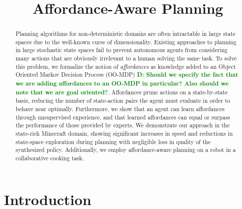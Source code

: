\documentclass[conference]{IEEEtran}
\newcommand{\dnote}[1]{\textcolor{Green}{\textbf{D: #1}}}
\begin{document}
\title{Affordance-Aware Planning}

\author{
}

\maketitle

\begin{abstract}
Planning algorithms for non-deterministic domains are often
intractable in large state spaces due to the well-known curse of
dimensionality. Existing approaches to planning in large stochastic state spaces fail to
prevent autonomous agents from considering many actions that are
obviously irrelevant to a human solving the same task. To solve this problem,
we formalize the notion of {\em affordances} as knowledge added to an 
Object Oriented Markov Decision Process (OO-MDP) \dnote{Should we specify the fact that
we are adding affordances to an OO-MDP in particular? Also should we note that we are goal oriented?}.
Affordances prune actions on a state-by-state basis, reducing the number of 
state-action pairs the agent must evaluate in order to behave near optimally.
Furthermore, we show that an agent can learn affordances through unsupervised 
experience, and that learned affordances can equal or surpass the performance of those
provided by experts. We demonstrate our approach in the state-rich Minecraft domain, 
showing significant increases in speed and reductions in state-space exploration during
planning with negligible loss in quality of the synthesized policy. Additionally, we 
employ affordance-aware planning on a robot in a collaborative cooking task. 

\end{abstract}

\IEEEpeerreviewmaketitle

\section{Introduction}
\label{sec:introduction}
\end{document}
